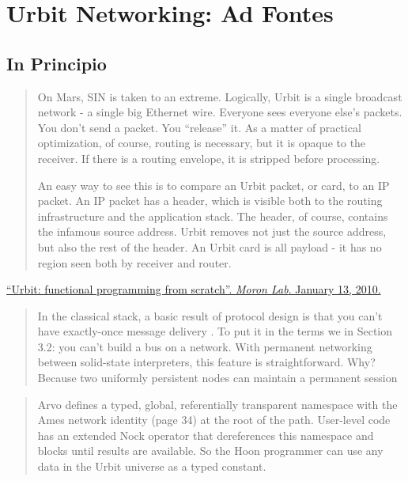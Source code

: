 \section{Urbit Networking: Ad Fontes}

\subsection{In Principio}

\begin{quote}
On Mars, SIN is taken to an extreme. Logically, Urbit is a single
broadcast network - a single big Ethernet wire. Everyone sees everyone
else's packets. You don't send a packet. You ``release'' it. As a matter
of practical optimization, of course, routing is necessary, but it is
opaque to the receiver. If there is a routing envelope, it is stripped
before processing.

An easy way to see this is to compare an Urbit packet, or card, to an IP
packet. An IP packet has a header, which is visible both to the routing
infrastructure and the application stack. The header, of course,
contains the infamous source address. Urbit removes not just the source
address, but also the rest of the header. An Urbit card is all payload -
it has no region seen both by receiver and router.
\end{quote}

\href{https://moronlab.blogspot.com/2010/01/urbit-functional-programming-from.html}{``Urbit:
functional programming from scratch''. \emph{Moron Lab}. January 13,
2010.}

\begin{quote}
In the classical stack, a basic result of protocol design is that you
can't have exactly-once message delivery . To put it in the terms we in
Section 3.2: you can't build a bus on a network. With permanent
networking between solid-state interpreters, this feature is
straightforward. Why? Because two uniformly persistent nodes can
maintain a permanent session
\end{quote}

\begin{quote}
Arvo defines a typed, global, referentially transparent namespace with
the Ames network identity (page 34) at the root of the path. User-level
code has an extended Nock operator that dereferences this namespace and
blocks until results are available. So the Hoon programmer can use any
data in the Urbit universe as a typed constant.
\end{quote}

